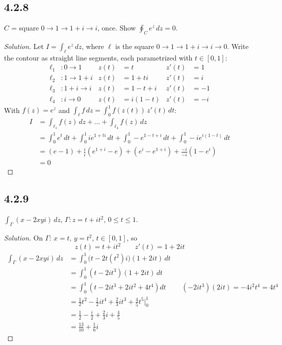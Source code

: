 \documentclass{article}
\newenvironment{solution}{
\begin{proof}[Solution]}{
\end{proof}}
\begin{document}
\subsection*{4.2.8}
$C$ = square $0 \to 1 \to 1+i \to i$, once. Show $\oint_C e^z\,dz = 0$.
\begin{solution}
  Let $I = \int_\ell e^z\,dz$, where $\ell$ is the square $0 \to 1 \to 1+i \to i \to 0$.
  Write the contour as straight line segments, each parametrized with $t \in [0,1]$:
  \begin{align*}
    \ell_1 & : 0 \to 1     & z(t) & = t       & z'(t) & = 1  \\
    \ell_2 & : 1 \to 1+i   & z(t) & = 1+ti    & z'(t) & = i  \\
    \ell_3 & : 1+i \to i   & z(t) & = 1-t+i   & z'(t) & = -1 \\
    \ell_4 & : i \to 0     & z(t) & = i(1-t)  & z'(t) & = -i
  \end{align*}
  With $f(z) = e^z$ and $\int_\ell f\,dz = \int_0^1 f(z(t))\,z'(t)\,dt$:
  \begin{align*}
    I & = \int_{\ell_1} f(z)\,dz + \dots + \int_{\ell_4} f(z)\,dz \\
      & = \int_0^1 e^t\,dt + \int_0^1 ie^{1+ti}\,dt + \int_0^1 -e^{1-t+i}\,dt + \int_0^1 -ie^{i(1-t)}\,dt \\
      & = (e-1) + \frac{i}{i}\left(e^{1+i}-e\right) + \left(e^i - e^{1+i}\right) + \frac{-i}{-i}\left(1-e^i\right) \\
      & = 0
  \end{align*}
\end{solution}

\subsection*{4.2.9}
$\int_\Gamma (x - 2xyi)\,dz$, $\Gamma: z = t + it^2$, $0 \le t \le 1$.
\begin{solution}
  On $\Gamma$: $x = t$, $y = t^2$, $t \in [0,1]$, so
  \[
    z(t) = t + it^2 \qquad z'(t) = 1 + 2it
  \]
  \begin{align*}
    \int_\Gamma (x - 2xyi)\,dz
    & = \int_0^1 \big(t - 2t(t^2)i\big)(1+2it)\,dt \\
    & = \int_0^1 (t - 2it^3)(1+2it)\,dt \\
    & = \int_0^1 \left(t - 2it^3 + 2it^2 + 4t^4\right)dt
      && (-2it^3)(2it) = -4i^2t^4 = 4t^4 \\
    & = \frac{1}{2}t^2 - \frac{1}{2}it^4 + \frac{2}{3}it^3 + \frac{4}{5}t^5 \Big|_0^1 \\
    & = \frac{1}{2} - \frac{i}{2} + \frac{2}{3}i + \frac{4}{5} \\
    & = \frac{13}{10} + \frac{1}{6}i
  \end{align*}
\end{solution}
\end{document}
